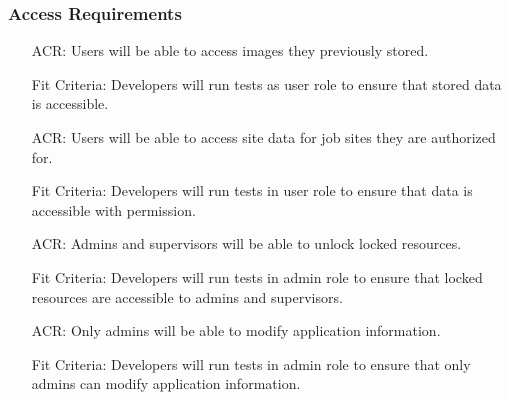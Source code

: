 \documentclass[12pt]{article}
\newcounter{reqnum} %
\newcounter{acrreqnum} %
\newcounter{crreqnum} %
\begin{document}
\subsubsection{Access Requirements}
\begin{itemize}
    \item[ACR\refstepcounter{acrreqnum}\theacrreqnum \label{R_Inputs}:] Users will be able to access images they previously stored.
    \item[] Fit Criteria: Developers will run tests as user role to ensure that stored data is accessible.
    \item[ACR\refstepcounter{acrreqnum}\theacrreqnum\label{R_Inputs}:] 
    Users will be able to access site data for job sites they are authorized for.
    \item[] Fit Criteria: Developers will run tests in user role to ensure that data is accessible with permission.
    \item[ACR\refstepcounter{acrreqnum}\theacrreqnum \label{R_Inputs}:]
    Admins and supervisors will be able to unlock locked resources.
    \item[] Fit Criteria: Developers will run tests in admin role to ensure that locked resources are accessible to admins and supervisors.
    \item[ACR\refstepcounter{acrreqnum}\theacrreqnum \label{R_Inputs}:]
    Only admins will be able to modify application information.
    \item[] Fit Criteria: Developers will run tests in admin role to ensure that only admins can modify application information.
\end{itemize}
\end{document}
